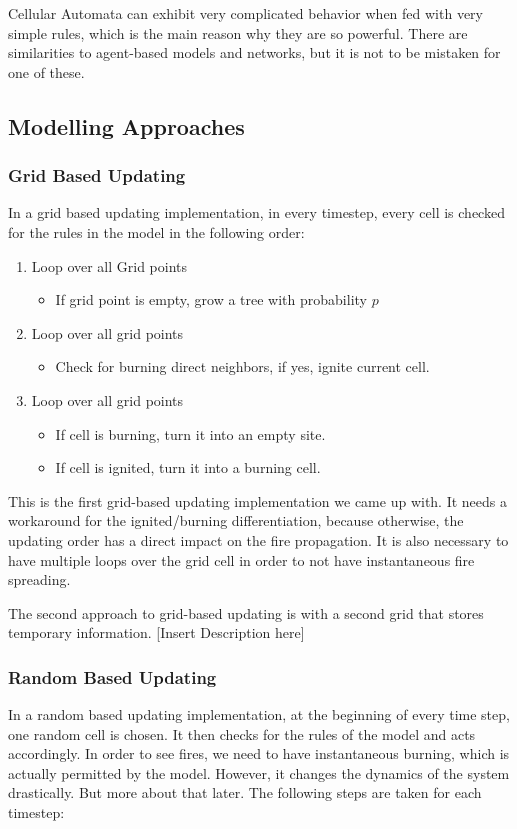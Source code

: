 \documentclass[11pt]{article}
\begin{document}
Cellular Automata can exhibit very complicated behavior when fed with very simple rules, which is the main reason why they are so powerful. There are similarities to agent-based models and networks, but it is not to be mistaken for one of these.

\subsection{Modelling Approaches}
\subsubsection{Grid Based Updating}
In a grid based updating implementation, in every timestep, every cell is checked for the rules in the model in the following order:
\begin{enumerate}
\item Loop over all Grid points
\begin{itemize}
\item If grid point is empty, grow a tree with probability $p$
\end {itemize}
\item Loop over all grid points
\begin {itemize}
\item Check for burning direct neighbors, if yes, ignite current cell.
\end {itemize}
\item Loop over all grid points 
\begin {itemize}
\item If cell is burning, turn it into an empty site.
\item If cell is ignited, turn it into a burning cell.
\end {itemize}
\end {enumerate}

This is the first grid-based updating implementation we came up with. It needs a workaround for the ignited/burning differentiation, because otherwise, the updating order has a direct impact on the fire propagation. It is also necessary to have multiple loops over the grid cell in order to not have instantaneous fire spreading.

The second approach to grid-based updating is with a second grid that stores temporary information. [Insert Description here]

\subsubsection{Random Based Updating}
In a random based updating implementation, at the beginning of every time step, one random cell is chosen. It then checks for the rules of the model and acts accordingly. In order to see fires, we need to have instantaneous burning, which is actually permitted by the model. However, it changes the dynamics of the system drastically. But more about that later. The following steps are taken for each timestep:
\end{document}
